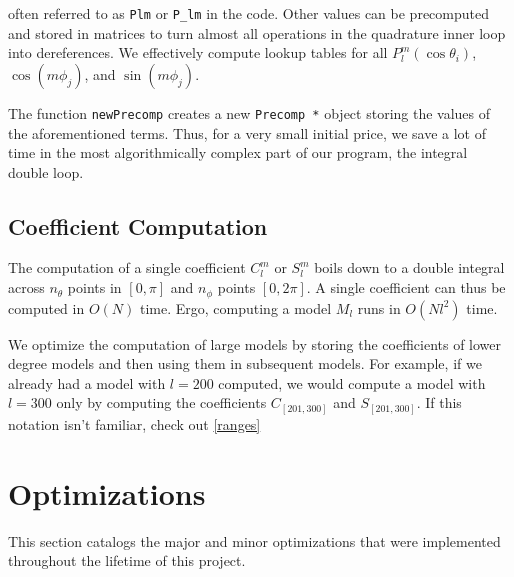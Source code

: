 \documentclass[a4paper]{article}
\theoremstyle{definition}
\begin{document}
often referred to as \texttt{Plm} or \texttt{P\_lm} in the code. Other values can be precomputed and stored in matrices to turn almost all operations
in the quadrature inner loop into dereferences. We effectively compute lookup tables for all $P_l^m(\cos \theta_i)$, $\cos(m\phi_j)$, and $\sin(m\phi_j)$.

The function \texttt{newPrecomp} creates a new \texttt{Precomp *} object storing the values of the aforementioned terms. Thus, for a very small initial price,
we save a lot of time in the most algorithmically complex part of our program, the integral double loop.


\subsection{Coefficient Computation}

The computation of a single coefficient $C_l^m$ or $S_l^m$ boils down to a double integral across $n_\theta$ points in $[0, \pi]$
and $n_\phi$ points $[0, 2\pi]$. A single coefficient can thus be computed in $O(N)$ time. Ergo, computing a model $M_l$ runs in 
$O(Nl^2)$ time.

We optimize the computation of large models by storing the coefficients of lower degree models and then using them in subsequent 
models. For example, if we already had a model with $l = 200$ computed, we would compute a model with $l = 300$ only by computing 
the coefficients $C_{[201, 300]}$ and $S_{[201, 300]}$. If this notation isn't familiar, check out \ref{ranges}

\section{Optimizations}

This section catalogs the major and minor optimizations that were implemented throughout the lifetime of this project.

\nocite{*}



\end{document}

